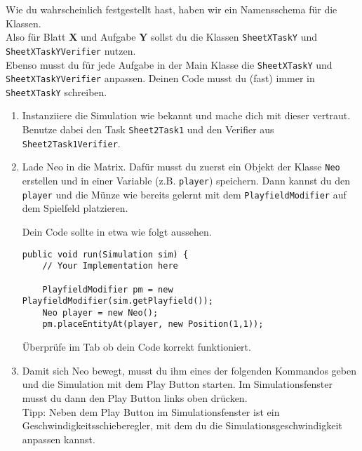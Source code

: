 


\begin{Infobox}
    Wie du wahrscheinlich festgestellt hast, haben wir ein Namensschema für die Klassen.\\
    Also für Blatt \textbf{X} und Aufgabe \textbf{Y} sollst du die Klassen \lstinline{SheetXTaskY} und \lstinline{SheetXTaskYVerifier} nutzen.\\
    Ebenso musst du für jede Aufgabe in der Main Klasse die \lstinline{SheetXTaskY} und \lstinline{SheetXTaskYVerifier} anpassen.
    Deinen Code musst du (fast) immer in \lstinline{SheetXTaskY} schreiben.
\end{Infobox}

\begin{enumerate}
    \item Instanziiere die Simulation wie bekannt und mache dich mit dieser vertraut. 
        Benutze dabei den Task \lstinline{Sheet2Task1} und den Verifier aus \lstinline{Sheet2Task1Verifier}.
    \item Lade Neo in die Matrix.
        Dafür musst du zuerst ein Objekt der Klasse \lstinline{Neo} erstellen und in einer Variable (z.B. \lstinline{player}) speichern.
        Dann kannst du den \lstinline{player} und die Münze wie bereits gelernt mit dem \lstinline{PlayfieldModifier} auf dem Spielfeld platzieren.

        Dein Code sollte in etwa wie folgt aussehen.

        \begin{lstlisting}[firstnumber=14]
public void run(Simulation sim) {
    // Your Implementation here

    PlayfieldModifier pm = new PlayfieldModifier(sim.getPlayfield());
    Neo player = new Neo();
    pm.placeEntityAt(player, new Position(1,1));
        \end{lstlisting}

        Überprüfe im  Tab ob dein Code korrekt funktioniert.
    \item Damit sich Neo bewegt, musst du ihm eines der folgenden Kommandos geben und die Simulation mit dem Play Button starten. Im Simulationsfenster musst du dann den Play Button links oben drücken. \\
    Tipp: Neben dem Play Button im Simulationsfenster ist ein Geschwindigkeitsschieberegler, mit dem du die Simulationsgeschwindigkeit anpassen kannst.


\end{enumerate}
